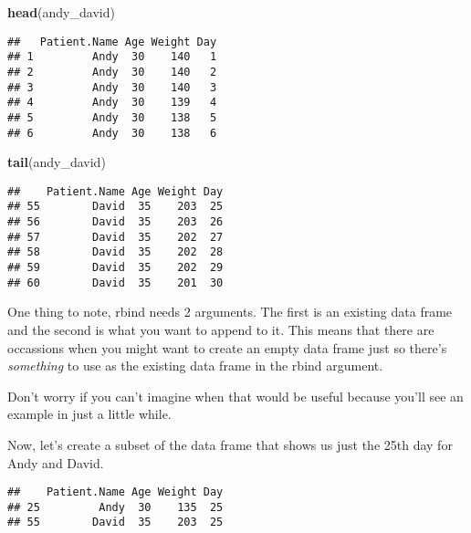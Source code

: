 \documentclass[
]{article}
\newenvironment{Shaded}{\begin{snugshade}}{\end{snugshade}}
\newcommand{\DecValTok}[1]{\textcolor[rgb]{0.00,0.00,0.81}{#1}}
\newcommand{\KeywordTok}[1]{\textcolor[rgb]{0.13,0.29,0.53}{\textbf{#1}}}
\newcommand{\NormalTok}[1]{#1}
\newcommand{\OperatorTok}[1]{\textcolor[rgb]{0.81,0.36,0.00}{\textbf{#1}}}
\newcommand{\StringTok}[1]{\textcolor[rgb]{0.31,0.60,0.02}{#1}}
\begin{document}
\begin{Shaded}
\begin{Highlighting}[]
\KeywordTok{head}\NormalTok{(andy_david)}
\end{Highlighting}
\end{Shaded}

\begin{verbatim}
##   Patient.Name Age Weight Day
## 1         Andy  30    140   1
## 2         Andy  30    140   2
## 3         Andy  30    140   3
## 4         Andy  30    139   4
## 5         Andy  30    138   5
## 6         Andy  30    138   6
\end{verbatim}

\begin{Shaded}
\begin{Highlighting}[]
\KeywordTok{tail}\NormalTok{(andy_david)}
\end{Highlighting}
\end{Shaded}

\begin{verbatim}
##    Patient.Name Age Weight Day
## 55        David  35    203  25
## 56        David  35    203  26
## 57        David  35    202  27
## 58        David  35    202  28
## 59        David  35    202  29
## 60        David  35    201  30
\end{verbatim}

One thing to note, rbind needs 2 arguments. The first is an existing
data frame and the second is what you want to append to it. This means
that there are occassions when you might want to create an empty data
frame just so there's \emph{something} to use as the existing data frame
in the rbind argument.

Don't worry if you can't imagine when that would be useful because
you'll see an example in just a little while.

Now, let's create a subset of the data frame that shows us just the 25th
day for Andy and David.

\begin{Shaded}
\end{Shaded}

\begin{verbatim}
##    Patient.Name Age Weight Day
## 25         Andy  30    135  25
## 55        David  35    203  25
\end{verbatim}
\end{document}
